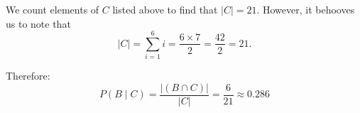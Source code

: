 \documentclass[a4paper,11pt]{article}
\begin{document}
We count elements of $C$ listed above to find that $\left| C \right|
= 21$.  However, it behooves us to note that 
\begin{equation}
  \left| C \right| = \sum_{i=1}^{6} i = \frac{6 \times 7} {2} = 
    \frac{42}{2} = 21.
\end{equation}

Therefore:
\begin{equation}
  P\left( B \mid C \right) = 
  \frac{\left| \left( B \cap C \right) \right|} {\left| C \right|}
  = \frac{6}{21} \approx 0.286
\end{equation}
\printbibliography{}
\end{document}
